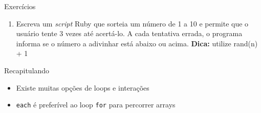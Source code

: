 \begin{frame}{Exercícios}
  \begin{enumerate}
    \item Escreva um \textit{script} Ruby que sorteia um número de 1 a 10 e permite que 
    o usuário tente 3 vezes até acertá-lo. A cada tentativa errada, o programa informa
    se o número a adivinhar está abaixo ou acima. \textbf{Dica:} utilize rand(n) + 1 
  \end{enumerate}
  \framebreak
  
\end{frame}

\begin{frame}[fragile,t]{Recapitulando}
  \begin{itemize}
    \item Existe muitas opções de loops e interações
    \item \verb!each! é \alert{preferível} ao loop \verb!for! para percorrer arrays
  \end{itemize}
\end{frame}



